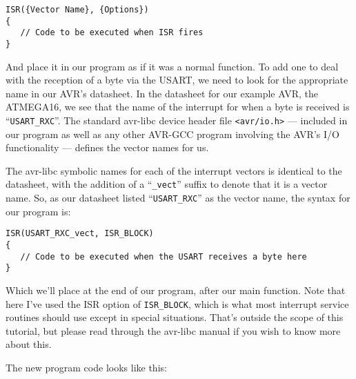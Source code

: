 \documentclass[a4paper,oneside]{book}
\begin{document}
\begin{center}
\begin{lstlisting}
ISR({Vector Name}, {Options})
{
   // Code to be executed when ISR fires
}
\end{lstlisting}
\end{center}

And place it in our program as if it was a normal function. To add one to deal with the reception of a byte via the USART, we need to look for the appropriate name in our AVR's datasheet. In the datasheet for our example AVR, the ATMEGA16, we see that the name of the interrupt for when a byte is received is ``\texttt{USART\_RXC}''. The standard avr-libc device header file \texttt{<avr/io.h>} --- included in our program as well as any other AVR-GCC program involving the AVR's I/O functionality --- defines the vector names for us.

The avr-libc symbolic names for each of the interrupt vectors is identical to the datasheet, with the addition of a ``\texttt{\_vect}'' suffix to denote that it is a vector name. So, as our datasheet listed ``\texttt{USART\_RXC}'' as the vector name, the syntax for our program is:

\begin{center}
\begin{lstlisting}
ISR(USART_RXC_vect, ISR_BLOCK)
{
   // Code to be executed when the USART receives a byte here
}
\end{lstlisting}
\end{center}

Which we'll place at the end of our program, after our main function. Note that here I've used the ISR option of \texttt{ISR\_BLOCK}, which is what most interrupt service routines should use except in special situations. That's outside the scope of this tutorial, but please read through the avr-libc manual if you wish to know more about this.

The new program code looks like this:
\end{document}
